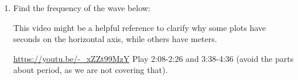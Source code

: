 \documentclass[12pt,noauthor,nooutcomes,hints,handout]{ximera}
\begin{document}
\begin{question}
\begin{enumerate}
\begin{center}
\begin{tikzpicture}
    \end{tikzpicture}
\end{center}
\item Find the frequency of the wave below:
\begin{center}
\end{center}

\begin{instructorNotes}

This video might be a helpful reference to clarify why some plots have seconds on the horizontal axis, while others have meters.

\url{https://youtu.be/-_xZZt99MzY}
Play 2:08-2:26 and 3:38-4:36 (avoid the parts about period, as we are not covering that).
\end{instructorNotes}


\end{enumerate}
\end{question}
\end{document}
